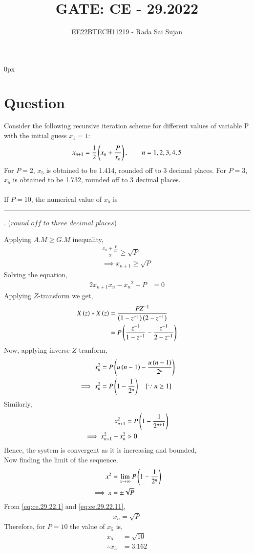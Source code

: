 \documentclass[journal,12pt,twocolumn]{IEEEtran}
\theoremstyle{remark}
\begin{document}
\parindent 0px

\title{GATE: CE - 29.2022}
\author{EE22BTECH11219 - Rada Sai Sujan$^{}$%
}
\maketitle
\newpage
\bigskip
\section*{Question}
Consider the following recursive iteration scheme for different values of variable P with the initial guess $x_1=1$:
$$x_{n+1}=\frac{1}{2}\left(x_n+\frac{P}{x_n}\right), \quad\quad n=1,2,3,4,5 $$
For $P=2$, $x_5$ is obtained to be 1.414, rounded off to 3 decimal places. For $P=3$, $x_5$ is obtained to be 1.732, rounded off to 3 decimal places.   \\ \\
If $P=10$, the numerical value of $x_5$ is \rule{1.3cm}{0.15mm} . ($round$ $off$ $to$ $three$ $decimal$ $places$)   \\
\solution 

Applying $A.M \geq G.M$ inequality,
\begin{align}
    \frac{x_n+\frac{P}{x_n}}{2} \geq \sqrt{P}   \\
    \implies x_{n+1} \geq \sqrt{P}  \label{eq:ce.29.22.1}
\end{align}
Solving the equation,
\begin{align}
    2x_{n+1}x_{n} - {x_n}^2 - P &=0
\end{align}
Applying $Z$-transform we get,
\begin{align}
    X\left(z\right) \ast X\left(z\right) &= \frac{PZ^{-1}}{\left(1-z^{-1}\right)\left(2-z^{-1}\right)}  \\
    &= P\left(\frac{z^{-1}}{1-z^{-1}} - \frac{z^{-1}}{2-z^{-1}}\right)
\end{align}
Now, applying inverse $Z$-tranform,
\begin{align}
    x_n^2 &= P\left(u\left(n-1\right) - \frac{u\left(n-1\right)}{2^n}\right)  \\
    \implies x_n^2 &=P\left(1-\frac{1}{2^n}\right) \quad \text{[$\because n \geq 1$]}
\end{align}
Similarly,
\begin{align}
    x_{n+1}^2 &= P\left(1 - \frac{1}{2^{n+1}}\right)  \\
    \implies x_{n+1}^2 - x_n^2 &> 0
\end{align}
Hence, the system is convergent as it is increasing and bounded,    \\
Now finding the limit of the sequence,
\begin{align}
    x^2 &=\lim\limits_{x\to\infty}P\left(1-\frac{1}{2^n}\right)   \\
    \implies x &= \pm\sqrt{P}   \label{eq:ce.29.22.11}
\end{align}
From \eqref{eq:ce.29.22.1} and \eqref{eq:ce.29.22.11},
\begin{align}
    x_n=\sqrt{P}
\end{align}
Therefore, for $P=10$ the value of $x_5$ is,
\begin{align}
    x_5&=\sqrt{10}  \\
    \therefore x_5&=3.162
\end{align}
\end{document}
